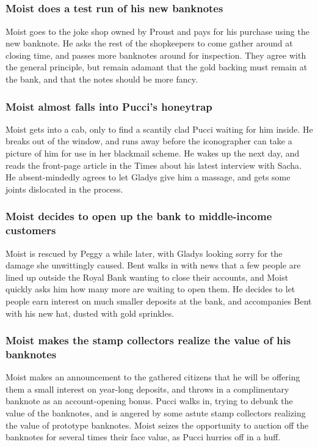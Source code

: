 \subsection{}
\subsubsection{\Gls{Moist} does a test run of his new banknotes}
\Gls{Moist} goes to the joke shop owned by \Gls{Proust} and pays for his purchase using the new
banknote. He asks the rest of the shopkeepers to come gather around at closing time, and passes
more banknotes around for inspection. They agree with the general principle, but remain adamant that
the gold backing must remain at the bank, and that the notes should be more fancy.

\subsubsection{\Gls{Moist} almost falls into \Gls{Pucci}'s honeytrap}
\Gls{Moist} gets into a cab, only to find a scantily clad \Gls{Pucci} waiting for him inside. He
breaks out of the window, and runs away before the iconographer can take a picture of him for use in
her blackmail scheme. He wakes up the next day, and reads the front-page article in the Times about
his latest interview with \Gls{Sacha}. He absent-mindedly agrees to let \Gls{Gladys} give him a
massage, and gets some joints dislocated in the process.

\subsubsection{\Gls{Moist} decides to open up the bank to middle-income customers}
\Gls{Moist} is rescued by \Gls{Peggy} a while later, with \Gls{Gladys} looking sorry for the
damage she unwittingly caused. \Gls{Bent} walks in with news that a few people are lined up outside
the Royal Bank wanting to close their accounts, and \Gls{Moist} quickly asks him how many more are
waiting to open them. He decides to let people earn interest on much smaller deposits at the bank,
and accompanies \Gls{Bent} with his new hat, dusted with gold sprinkles.

\subsubsection{\Gls{Moist} makes the stamp collectors realize the value of his banknotes}
\Gls{Moist} makes an announcement to the gathered citizens that he will be offering them a small
interest on year-long deposits, and throws in a complimentary banknote as an account-opening bonus.
\Gls{Pucci} walks in, trying to debunk the value of the banknotes, and is angered by some astute
stamp collectors realizing the value of prototype banknotes. \Gls{Moist} seizes the opportunity to
auction off the banknotes for several times their face value, as \Gls{Pucci} hurries off in a huff.

